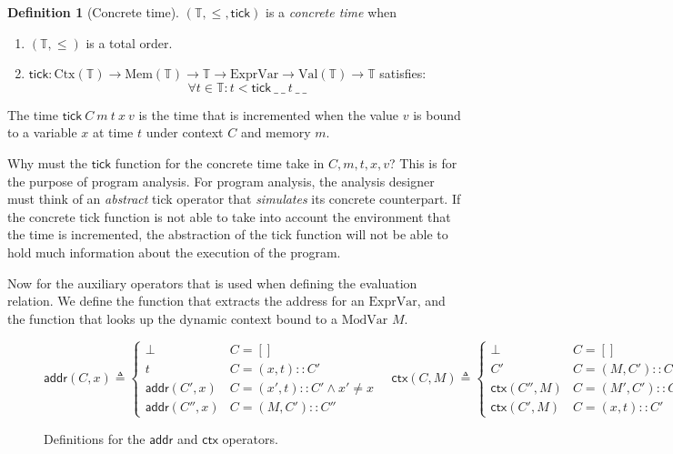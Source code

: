 \documentclass[acmsmall,review]{acmart}\settopmatter{printfolios=true,printccs=false,printacmref=false}
\theoremstyle{definition}
\newtheorem{definition}{Definition}[section]
\newcommand*{\cons}{::}
\newcommand*{\ExprVar}{\text{ExprVar}}
\newcommand*{\ModVar}{\text{ModVar}}
\newcommand*{\Time}{\mathbb{T}}
\newcommand*{\Ctx}[1]{\text{Ctx}({#1})}
\newcommand*{\Value}[1]{\text{Val}({#1})}
\newcommand*{\Mem}[1]{\text{Mem}({#1})}
\newcommand*{\mem}{m}
\newcommand*{\addr}{\mathsf{addr}}
\newcommand*{\tick}{\mathsf{tick}}
\newcommand*{\modctx}{\mathsf{ctx}}
\begin{document}
\begin{definition}[Concrete time]
  $(\Time, \le, \tick)$ is a \emph{concrete time} when
  \begin{enumerate}
    \item $(\Time, \le)$ is a total order.
    \item $\tick : \Ctx{\Time}\rightarrow\Mem{\Time}\rightarrow\Time\rightarrow\ExprVar\rightarrow\Value{\Time}\rightarrow\Time$ satisfies:
          \[\forall t\in\Time: t < \tick\:\_\:\_\:t\:\_\:\_\]
  \end{enumerate}
\end{definition}
The time $\tick\:C\:\mem\:t\:x\:v$ is the time that is incremented when the value $v$ is bound to a variable $x$ at time $t$ under context $C$ and memory $m$.

Why must the $\tick$ function for the concrete time take in $C, m, t, x, v$?
This is for the purpose of program analysis.
For program analysis, the analysis designer must think of an \emph{abstract} tick operator that \emph{simulates} its concrete counterpart.
If the concrete tick function is not able to take into account the environment that the time is incremented, the abstraction of the tick function will not be able to hold much information about the execution of the program.

Now for the auxiliary operators that is used when defining the evaluation relation.
We define the function that extracts the address for an $\ExprVar$,
and the function that looks up the dynamic context bound to a $\ModVar$ $M$.

\begin{figure}[h!]
  \centering
  \footnotesize
  \[
    \addr(C,x)\triangleq
    \begin{cases}
      \bot         & C=[]                              \\
      t            & C=(x, t)\cons C'                  \\
      \addr(C',x)  & C=(x', t)\cons C' \wedge x'\neq x \\
      \addr(C'',x) & C=(M, C')\cons C''
    \end{cases}
    \quad
    \modctx(C,M)\triangleq
    \begin{cases}
      \bot           & C=[]                               \\
      C'             & C=(M, C')\cons C''                 \\
      \modctx(C'',M) & C=(M', C')\cons C''\wedge M'\neq M \\
      \modctx(C',M)  & C=(x, t)\cons C'
    \end{cases}
  \]
  \caption{Definitions for the $\addr$ and $\modctx$ operators.}
\end{figure}
\end{document}
